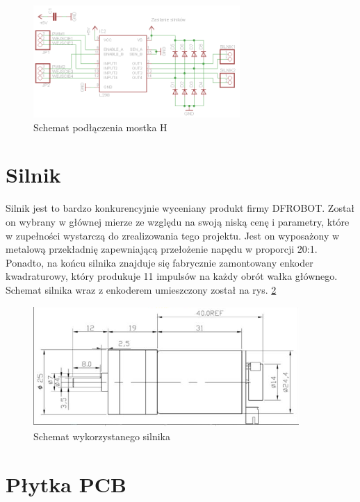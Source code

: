             \begin{figure}[ht]
                \centering
                \includegraphics[width=0.7\textwidth]{img/h_bridge_connection.png}
                \caption{Schemat podłączenia mostka H}
                \label{fig:h_bridge_connection}
            \end{figure}
            
        \section{Silnik}
            Silnik jest to bardzo konkurencyjnie wyceniany produkt firmy DFROBOT. Został on wybrany w głównej mierze ze względu na swoją niską cenę i parametry, które w zupełności wystarczą do zrealizowania tego projektu. Jest on wyposażony w metalową przekładnię zapewniającą przełożenie napędu w proporcji 20:1. Ponadto, na końcu silnika znajduje się fabrycznie zamontowany enkoder kwadraturowy, który produkuje 11 impulsów na każdy obrót wałka głównego. Schemat silnika wraz z enkoderem umieszczony został na rys. \ref{fig:engine}
            
            \begin{figure}[ht]
                \centering
                \includegraphics[width=0.9\textwidth]{img/silnik.png}
                \caption{Schemat wykorzystanego silnika}
                \label{fig:engine}
            \end{figure}


        \section{Płytka PCB}
